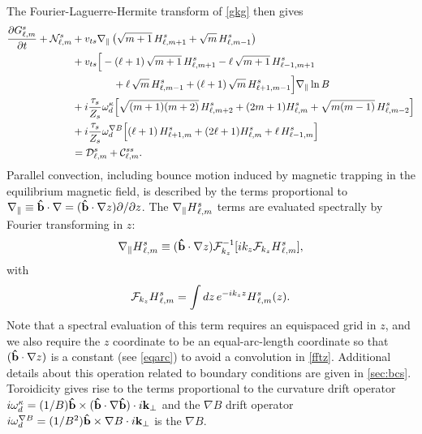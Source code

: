 \documentclass{jpp}
\begin{document}
The Fourier-Laguerre-Hermite transform of \cref{gkg} then gives
\begin{align}
\frac{\partial G_{\ell,m}^s}{\partial t} + \mathcal{N}_{\ell,m}^s & 
  + v_{ts} \nabla_\parallel \left( \sqrt{m+1} \, H^s_{\ell,m+1} + \sqrt{m} \, H^s_{\ell,m-1} \right) 
  \notag \\ & 
  +v_{ts}  \Big[ - (\ell+1) \, \sqrt{m+1} \, H^s_{\ell,m+1} - \ell \, \sqrt{m+1} \, H^s_{\ell-1,m+1} \notag
  \\
  & \qquad\qquad+ \ell \, \sqrt{m} \, H^s_{\ell,m-1} 
  + (\ell+1) \, \sqrt{m} \, H^s_{\ell+1,m-1} \Big] \nabla_\parallel \ln B
  \notag \\ & 
   + i\frac{\tau_s}{Z_s} \omega_{d}^\kappa \Big[ \sqrt{(m+1)(m+2)} \, H^s_{\ell,m+2} + (2m+1)H^s_{\ell,m} +\sqrt{m (m-1)} \, H^s_{\ell,m-2} \Big] \notag\\ &
   + i\frac{\tau_s}{Z_s} \omega_{d}^{\nabla B} \Big[  (\ell+1) \, H^s_{\ell+1,m} + (2\ell+1)H^s_{\ell,m} +\ell \, H^s_{\ell-1,m} \Big] \notag\\ &
   = \mathcal{D}_{\ell,m}^s + \mathcal{C}_{\ell,m}^{ss}.
\label{glmevolve}
\end{align}
Parallel convection, including bounce motion induced by magnetic
trapping in the equilibrium magnetic field, is described by the terms
proportional to $\nabla_\parallel \equiv {\bf \hat{b}} \cdot \nabla = ({\bf \hat{b}}\cdot\nabla z) \partial/\partial z$. The $\nabla_\parallel H{\color{black}^s_{\ell,m}}$ terms are evaluated spectrally by Fourier transforming in $z$:
\begin{equation}
    \nabla_\parallel H{\color{black}^s_{\ell,m}} \equiv {\color{black} ( {\bf \hat{b}} \cdot\nabla z)}\mathcal{F}_{k_{\color{black} z}}^{-1}[ i k_{\color{black} z} \mathcal{F}_{k_{\color{black} z}} H{\color{black}^s_{\ell,m}} ],  \label{fftz}
\end{equation}
with
\begin{equation}
    \mathcal{F}_{k_{\color{black} z}}H{\color{black}^s_{\ell,m}} = \int dz\, e^{-i k_{\color{black} z} z} H{\color{black}^s_{\ell,m}}(z).
\end{equation}
{\color{black} Note that a spectral evaluation of this term requires an equispaced grid in $z$, and we also require the $z$ coordinate to be an equal-arc-length coordinate so that $({\bf \hat{b}}\cdot\nabla z)$ is a constant (see \cref{eqarc}) to avoid a convolution in \cref{fftz}.}
Additional details about this operation {\color{black} related to boundary conditions} are given in \cref{sec:bcs}.
Toroidicity gives rise to the terms proportional to the curvature drift operator $i \omega_d^{\kappa} = (1/B){\bf \hat{b}}\times({\bf \hat{b}}\cdot\nabla{\bf \hat{b}})\cdot {i\bf k_\perp}$ and the $\nabla B$ drift operator $i \omega_d^{\nabla B} = (1/B^2){\bf \hat{b}}\times\nabla B\cdot {i\bf k_\perp}$ is the $\nabla B$.
\end{document}
